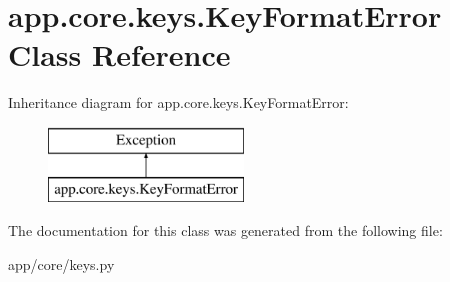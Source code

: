 \hypertarget{classapp_1_1core_1_1keys_1_1_key_format_error}{}\section{app.\+core.\+keys.\+Key\+Format\+Error Class Reference}
\label{classapp_1_1core_1_1keys_1_1_key_format_error}
Inheritance diagram for app.\+core.\+keys.\+Key\+Format\+Error\+:\begin{figure}[H]
\begin{center}
\leavevmode
\includegraphics[height=2.000000cm]{classapp_1_1core_1_1keys_1_1_key_format_error}
\end{center}
\end{figure}


The documentation for this class was generated from the following file\+:\begin{DoxyCompactItemize}
\item 
app/core/keys.\+py\end{DoxyCompactItemize}
